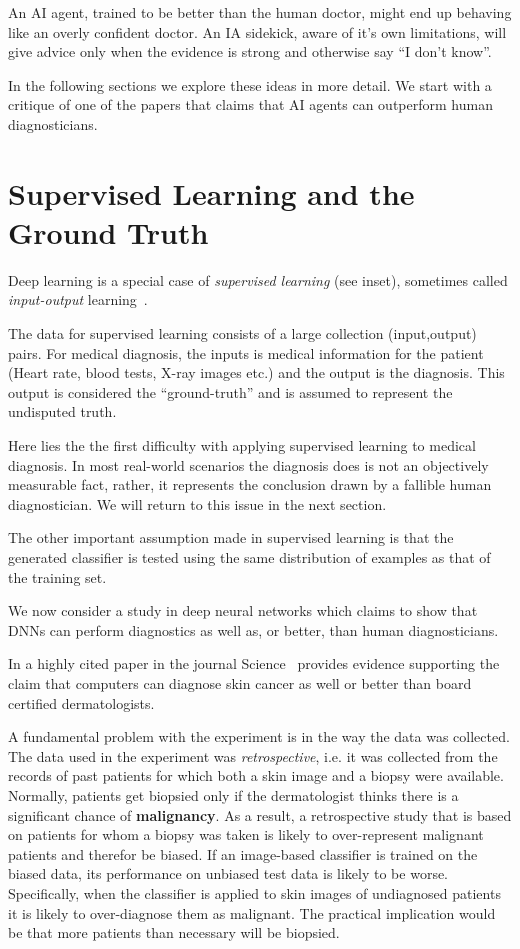 \documentclass[11pt]{pnas-new}
\begin{document}
An AI agent, trained to be better than the human doctor, might end up
behaving like an overly confident doctor. An IA sidekick, aware of
it's own limitations, will give advice only when the evidence is
strong and otherwise say ``I don't know''.

In the following sections we explore these ideas in more detail. We
start with a critique of one of the papers that claims that AI agents
can outperform human diagnosticians.

\section{Supervised Learning and the Ground Truth}
\label{sec:ground-truth}

Deep learning is a special case of {\em supervised learning} (see
inset), sometimes called {\em input-output}
learning~\cite{ng2016artificial,topol2019deep}.

The data for supervised learning consists of a large collection
(input,output) pairs. For medical diagnosis, the inputs is medical
information for the patient (Heart rate, blood tests, X-ray images
etc.) and the output is the diagnosis. This output is considered the
``ground-truth'' and is assumed to represent the undisputed truth.

Here lies the the first difficulty with applying supervised learning
to medical diagnosis. In most real-world scenarios the diagnosis
does is not an objectively measurable fact, rather, it
represents the conclusion drawn by a fallible human diagnostician. We  will
return to this issue in the next section.

The other important assumption made in supervised learning is that the
generated classifier is tested using the same distribution of examples
as that of the training set.

We now consider a study in deep neural networks which claims to show
that DNNs can perform diagnostics as well as, or better, than human diagnosticians. 

In a highly cited paper in the journal
Science~\cite{esteva2017dermatologist} provides evidence supporting
the claim that computers can diagnose skin cancer as well or better than board
certified dermatologists.

A fundamental problem with the experiment is in the way the data was
collected. The data used in the experiment was {\em retrospective},
i.e. it was collected from the records of past patients for which both
a skin image and a biopsy were available. Normally, patients get
biopsied only if the dermatologist thinks there is a significant
chance of {\bf malignancy}. As a result, a retrospective study that is
based on patients for whom a biopsy was taken is likely to
over-represent malignant patients and therefor be biased. If an image-based classifier
is trained on the biased data, its performance on unbiased test data
is likely to be worse. Specifically, when the classifier is applied to skin
images of undiagnosed patients it is likely to over-diagnose them as
malignant. The practical implication would be that more patients than
necessary will be biopsied.
\end{document}
